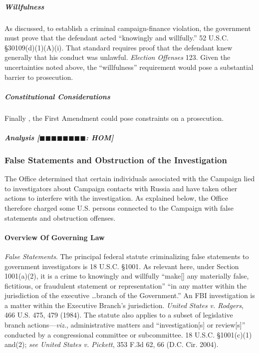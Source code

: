 \subparagraph{Willfulness}
As discussed, to establish a criminal campaign-finance violation, the government must prove that the defendant acted ``knowingly and willfully.''
52 U.S.C. \S 30109(d)(1)(A)(i).
That standard requires proof that the defendant knew generally that his conduct was unlawful.
\textit{Election Offenses} 123.
Given the uncertainties noted above, the ``willfulness'' requirement would pose a substantial barrier to prosecution.

\subparagraph{Constitutional Considerations}
Finally , the First Amendment could pose constraints on a prosecution.

\subparagraph{Analysis [$\blacksquare\blacksquare\blacksquare\blacksquare\blacksquare\blacksquare\blacksquare\blacksquare$: HOM]}



\subsubsection{False Statements and Obstruction of the Investigation}
The Office determined that certain individuals associated with the Campaign lied to investigators about Campaign contacts with Russia and have taken other actions to interfere with the investigation.
As explained below, the Office therefore charged some U.S. persons connected to the Campaign with false statements and obstruction offenses.

\paragraph{Overview Of Governing Law}
\textit{False Statements}.
The principal federal statute criminalizing false statements to government investigators is 18 U.S.C. \S 1001.
As relevant here, under Section 1001(a)(2), it is a crime to knowingly and willfully ``make[] any materially false, fictitious, or fraudulent statement or representation'' ``in any matter within the jurisdiction of the executive \dots branch of the Government.''
An FBI investigation is a matter within the Executive Branch's jurisdiction.
\textit{United States v. Rodgers}, 466 U.S. 475, 479 (1984).
The statute also applies to a subset of legislative branch actions---\textit{viz.}, administrative matters and ``investigation[s] or review[s]'' conducted by a congressional committee or subcommittee.
18 U.S.C. \S 1001(c)(1) and(2); \textit{see United States v. Pickett}, 353 F.3d 62, 66 (D.C. Cir. 2004).

